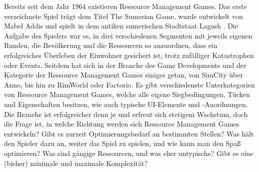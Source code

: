 
Bereits seit dem Jahr 1964 existieren Ressource Management Games. Das erste verzeichnete Spiel trägt dem Titel \glqq The Sumerian Game\grqq, wurde entwickelt von Mabel Addis und spielt in dem antiken sumerischen Stadtstaat Lagash \cite{rmgwiki}. Die Aufgabe des Spielers war es, in drei verschiedenen Segmenten mit jeweils eigenen Runden, die Bevölkerung und die Ressourcen so anzuordnen, dass ein erfolgreiches Überleben der Einwohner gesichert ist, trotz zufälliger Katastrophen oder Events. Seitdem hat sich in der Branche des Game Developments und der Kategorie der Ressource Management Games einiges getan, von SimCity über Anno, bis hin zu RimWorld oder Factorio. Es gibt verschiedenste Unterkategorien von Ressource Management Games, welche alle eigene Siegbedingungen, Tücken und Eigenschaften besitzen, wie auch typische UI-Elemente und -Anordnungen. Die Branche ist erfolgreicher denn je und erfreut sich stetigem Wachstum, doch die Frage ist, in welche Richtung werden sich Ressource Management Games entwickeln? Gibt es zurzeit Optimierungsbedarf an bestimmten Stellen? Was hält den Spieler dazu an, weiter das Spiel zu spielen, und wie kann man den Spaß optimieren? Was sind gängige Ressourcen, und was eher untypische? Gibt es eine (bisher) minimale und maximale Komplexität?
